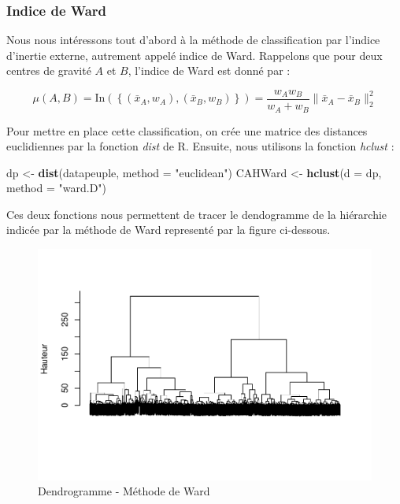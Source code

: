 \documentclass[
]{article}
\newenvironment{Shaded}{\begin{snugshade}}{\end{snugshade}}
\newcommand{\AttributeTok}[1]{\textcolor[rgb]{0.13,0.29,0.53}{#1}}
\newcommand{\FunctionTok}[1]{\textcolor[rgb]{0.13,0.29,0.53}{\textbf{#1}}}
\newcommand{\NormalTok}[1]{#1}
\newcommand{\OtherTok}[1]{\textcolor[rgb]{0.56,0.35,0.01}{#1}}
\newcommand{\StringTok}[1]{\textcolor[rgb]{0.31,0.60,0.02}{#1}}
\begin{document}
\hypertarget{indice-de-ward}{%
\subsubsection{Indice de Ward}\label{indice-de-ward}}

Nous nous intéressons tout d'abord à la méthode de classification par
l'indice d'inertie externe, autrement appelé indice de Ward. Rappelons
que pour deux centres de gravité \(A\) et \(B\), l'indice de Ward est
donné par :

\[
  \mu(A,B)=\text{In} \left( \left\{ (\bar{x}_A, w_A), (\bar{x}_B, w_B) \right\} \right) = \frac{w_A w_B}{w_A + w_B} \| \bar{x}_A - \bar{x}_B \|_2^2
\]

Pour mettre en place cette classification, on crée une matrice des
distances euclidiennes par la fonction \emph{dist} de R. Ensuite, nous
utilisons la fonction \emph{hclust} :

\begin{Shaded}
\begin{Highlighting}[]
\NormalTok{dp }\OtherTok{\textless{}{-}} \FunctionTok{dist}\NormalTok{(datapeuple, }\AttributeTok{method =} \StringTok{"euclidean"}\NormalTok{)}
\NormalTok{CAHWard }\OtherTok{\textless{}{-}} \FunctionTok{hclust}\NormalTok{(}\AttributeTok{d =}\NormalTok{ dp, }\AttributeTok{method =} \StringTok{"ward.D"}\NormalTok{)}
\end{Highlighting}
\end{Shaded}

Ces deux fonctions nous permettent de tracer le dendogramme de la
hiérarchie indicée par la méthode de Ward representé par la figure
ci-dessous.\\

\begin{figure}[H]

{\centering \includegraphics{ADM_DM2_EL_MAZZOUJI_Wahel_GILLET_Louison_files/figure-latex/DendrogrammeWard-1} 

}

\caption{Dendrogramme - Méthode de Ward}\label{fig:DendrogrammeWard}
\end{figure}
\end{document}
